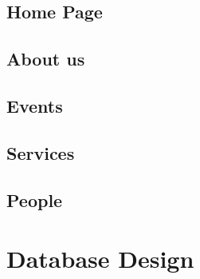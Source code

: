 \documentclass[11pt, a4paperm, hidelinks]{article}
\begin{document}
	\subsection{Home Page}
	
	\clearpage

	\subsection{About us}
	
	\clearpage

	\subsection{Events}
	
	\clearpage

	\subsection{Services}
	
	\clearpage

	\subsection{People}
	
	\clearpage

	\section{Database Design}	
	
	\clearpage
\end{document}
